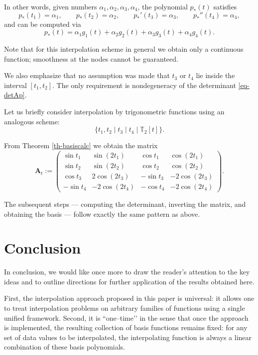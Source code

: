 \documentclass{article}
\theoremstyle{definition}
\theoremstyle{definition}
\numberwithin{figure}{section}
\newcommand{\1}{\mathbf{1}}
\begin{document}
In other words, given numbers \(\alpha_1,\alpha_2,\alpha_3,\alpha_4\), the polynomial \(p_*(t)\) satisfies
\[
    p_*(t_1)=\alpha_1,\qquad p_*(t_2)=\alpha_2,\qquad 
    p_*'(t_3)=\alpha_3,\qquad p_*''(t_4)=\alpha_4,
\]
and can be computed via
\[
    p_*(t) = \alpha_1 g_1(t) + \alpha_2 g_2(t) + \alpha_3 g_3(t) + \alpha_4 g_4(t).
\]

Note that for this interpolation scheme in general we obtain only a continuous function; smoothness at the nodes cannot be guaranteed.

We also emphasize that no assumption was made that \(t_3\) or \(t_4\) lie inside the interval \([t_1,t_2]\). The only requirement is nondegeneracy of the determinant \eqref{eq-detAp}.

\bigskip

Let us briefly consider interpolation by trigonometric functions using an analogous scheme:
\[
 \{t_1,t_2 \mid t_3 \mid t_4 \mid \mathbb{T}_{2}[t]\}.
\]

From Theorem \ref{th-basiscalc} we obtain the matrix
\[
    \mathbf{A}_t := 
    \begin{pmatrix}
        \sin t_1 & \sin(2t_1) & \cos t_1 & \cos(2t_1)\\
        \sin t_2 & \sin(2t_2) & \cos t_2 & \cos(2t_2)\\
        \cos t_3 & 2\cos(2t_3)& -\sin t_3 & -2\cos(2t_3)\\
        -\sin t_4 & -2\cos(2t_4)& -\cos t_4 & -2\cos(2t_4)
    \end{pmatrix}.
\]

The subsequent steps — computing the determinant, inverting the matrix, and obtaining the basis — follow exactly the same pattern as above.

\section{Conclusion}

In conclusion, we would like once more to draw the reader's attention to the key ideas and to outline directions for further application of the results obtained here.

First, the interpolation approach proposed in this paper is universal: it allows one to treat interpolation problems on arbitrary families of functions using a single unified framework. Second, it is “one–time’’ in the sense that once the approach is implemented, the resulting collection of basis functions remains fixed: for any set of data values to be interpolated, the interpolating function is always a linear combination of these basis polynomials.
\end{document}
